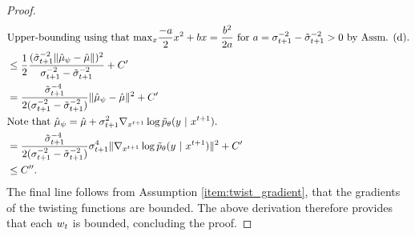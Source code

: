 \begin{proof}
\begin{align}
&\textrm{Upper-bounding using that $\mathrm{max}_{x}\frac{-a}{2}x^2 + bx =\frac{b^2}{2a}$ for $a = \sigma_{t+1}^{-2} - \tilde \sigma_{t+1}^{-2}>0$ by Assm. (d).}\\
&\le  \frac{1}{2} \frac{(\tilde \sigma_{t+1}^{-2}\| \hat\mu_\psi - \hat \mu\|)^2}{\sigma_{t+1}^{-2} - \tilde \sigma_{t+1}^{-2}} + C^\prime \\
&= \frac{\tilde \sigma_{t+1}^{-4}}{2( \sigma_{t+1}^{-2} - \tilde \sigma_{t+1}^{-2})}\| \hat\mu_\psi - \hat \mu\|^2  + C^\prime \\
& \textrm{Note that } \hat \mu_\psi = \hat \mu + \sigma_{t+1}^2 \nabla_{x^{t+1}}\log \tilde p_\theta(y~\vert~ x^{t+1}). \\ 
&= \frac{\tilde \sigma_{t+1}^{-4}}{2( \sigma_{t+1}^{-2} - \tilde \sigma_{t+1}^{-2})}\sigma_{t+1}^4 \| \nabla_{x^{t+1}} \log \tilde p_\theta(y ~\vert~ x^{t+1}) \|^2  + C^\prime \\
&\le C^{\prime\prime}.
\end{align}
The final line follows from Assumption \ref{item:twist_gradient}, that the gradients of the twisting functions are bounded.
The above derivation therefore provides that each $w_t$ is bounded, concluding the proof.
\end{proof}